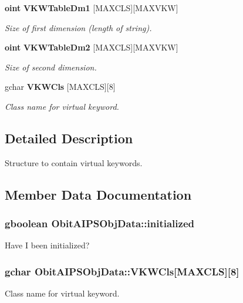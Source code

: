 \begin{CompactItemize}
{\bf oint} {\bf VKWTable\-Dm1} [MAXCLS][MAXVKW]
\begin{CompactList}\small\item\em Size of first dimension (length of string). \item\end{CompactList}\item 
{\bf oint} {\bf VKWTable\-Dm2} [MAXCLS][MAXVKW]
\begin{CompactList}\small\item\em Size of second dimension. \item\end{CompactList}\item 
gchar {\bf VKWCls} [MAXCLS][8]
\begin{CompactList}\small\item\em Class name for virtual keyword. \item\end{CompactList}\end{CompactItemize}


\subsection{Detailed Description}
Structure to contain virtual keywords. 



\subsection{Member Data Documentation}
\subsubsection{\setlength{\rightskip}{0pt plus 5cm}gboolean {\bf Obit\-AIPSObj\-Data::initialized}}\label{structObitAIPSObjData_o0}


Have I been initialized? 

\subsubsection{\setlength{\rightskip}{0pt plus 5cm}gchar {\bf Obit\-AIPSObj\-Data::VKWCls}[MAXCLS][8]}\label{structObitAIPSObjData_o8}


Class name for virtual keyword. 

